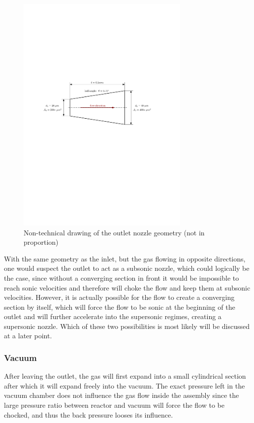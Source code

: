 	\begin{figure}[H]
	    \centering
	    \includegraphics[width=0.75\textwidth]{src/03_analytical-work/fig_outlet-nozzle-geometry.pdf}
	    \caption{Non-technical drawing of the outlet nozzle geometry (not in proportion)}
	    \label{fig:geometry-outlet-nozzle}
	\end{figure}
	With the same geometry as the inlet, but the gas flowing in opposite directions, one would suspect the outlet to act as a subsonic nozzle, which could logically be the case, since without a converging section in front it would be impossible to reach sonic velocities and therefore will choke the flow and keep them at subsonic velocities.
	However, it is actually possible for the flow to create a converging section by itself, which will force the flow to be sonic at the beginning of the outlet and will further accelerate into the supersonic regimes, creating a supersonic nozzle.
	Which of these two possibilities is most likely will be discussed at a later point.
	
\subsubsection*{Vacuum}

	After leaving the outlet, the gas will first expand into a small cylindrical section after which it will expand freely into the vacuum.
	The exact pressure left in the vacuum chamber does not influence the gas flow inside the assembly since the large pressure ratio between reactor and vacuum will force the flow to be chocked, and thus the back pressure looses its influence.
